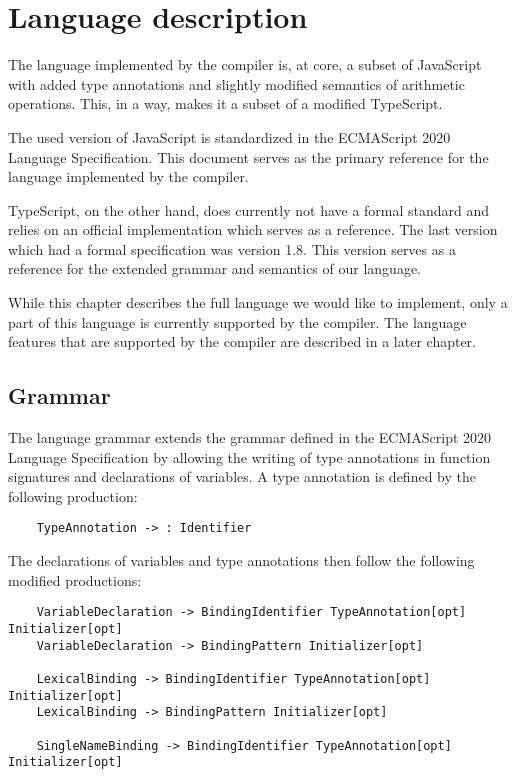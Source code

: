 \chapter{Language description}\label{language}

The language implemented by the compiler is, at core, a subset of JavaScript with added type annotations and slightly modified semantics of arithmetic operations. This, in a way, makes it a subset of a modified TypeScript.

The used version of JavaScript is standardized in the ECMAScript 2020 Language Specification\cite{ecma262}. This document serves as the primary reference for the language implemented by the compiler.

TypeScript, on the other hand, does currently not have a formal standard and relies on an official implementation which serves as a reference. The last version which had a formal specification was version 1.8\cite{typescript18}. This version serves as a reference for the extended grammar and semantics of our language.

While this chapter describes the full language we would like to implement, only a part of this language is currently supported by the compiler. The language features that are supported by the compiler are described in a later chapter.

\section{Grammar}

The language grammar extends the grammar defined in the ECMAScript 2020 Language Specification\cite{ecma262} by allowing the writing of type annotations in function signatures and declarations of variables. A type annotation is defined by the following production:

\begin{verbatim}
    TypeAnnotation -> : Identifier
\end{verbatim}


The declarations of variables and type annotations then follow the following modified productions:
\begin{verbatim}
    VariableDeclaration -> BindingIdentifier TypeAnnotation[opt] Initializer[opt]
    VariableDeclaration -> BindingPattern Initializer[opt]

    LexicalBinding -> BindingIdentifier TypeAnnotation[opt] Initializer[opt]
    LexicalBinding -> BindingPattern Initializer[opt]

    SingleNameBinding -> BindingIdentifier TypeAnnotation[opt] Initializer[opt]
\end{verbatim}

